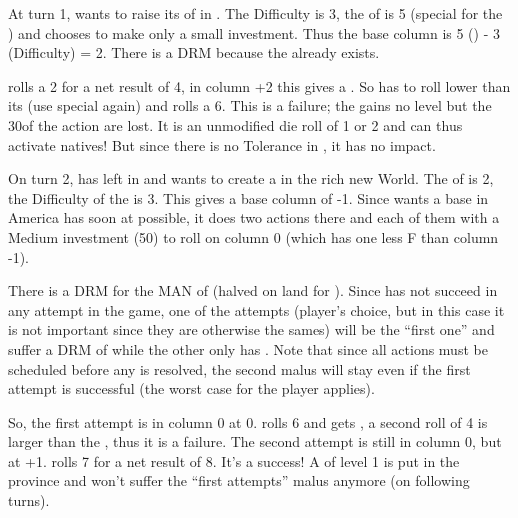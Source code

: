 \begin{exemple}
  At turn 1, \POR wants to raise its \COL of  in
  . The Difficulty is 3, the \FTI of \POR is 5
  (special \FTI for the \ROTW) and \POR chooses to make only a small
  investment. Thus the base column is 5 (\FTI) - 3 (Difficulty) = 2. There is
  a  DRM because the \COL already exists.

  \POR rolls a 2 for a net result of 4, in column +2 this gives a \undemi. So
  \POR has to roll lower than its \FTI (use special \FTI again) and rolls a
  6. This is a failure; the \COL gains no level but the 30\ducats of the
  action are lost. It is an unmodified die roll of 1 or 2 and can thus
  activate natives! But since there is no Tolerance in , it has no impact.

  \smallskip

  On turn 2, \HIS has left \leaderColon in \granderegionCuba and wants to
  create a \COL in the rich new World. The \FTI of \HIS is 2, the Difficulty
  of the \Area is 3. This gives a base column of -1. Since \HIS wants a base
  in America has soon at possible, it does two \COL actions there and each of
  them with a Medium investment (50\ducats) to roll on column 0 (which has one
  less F than column -1).

  There is a  DRM for the MAN of \leaderColon (halved on land for
  \LeaderE). Since \HIS has not succeed in any \COL attempt in the game, one
  of the attempts (player's choice, but in this case it is not important since
  they are otherwise the sames) will be the ``first one'' and suffer a DRM of
   while the other only has . Note that since all actions
  must be scheduled before any is resolved, the second malus will stay even if
  the first attempt is successful (the worst case for the player applies).

  So, the first attempt is in column 0 at 0. \HIS rolls 6 and gets \undemi, a
  second roll of 4 is larger than the \FTI, thus it is a failure. The second
  attempt is still in column 0, but at +1. \HIS rolls 7 for a net result of
  8. It's a success! A \COL of level 1 is put in the province and \HIS won't
  suffer the ``first attempts'' malus anymore (on following turns).
\end{exemple}


